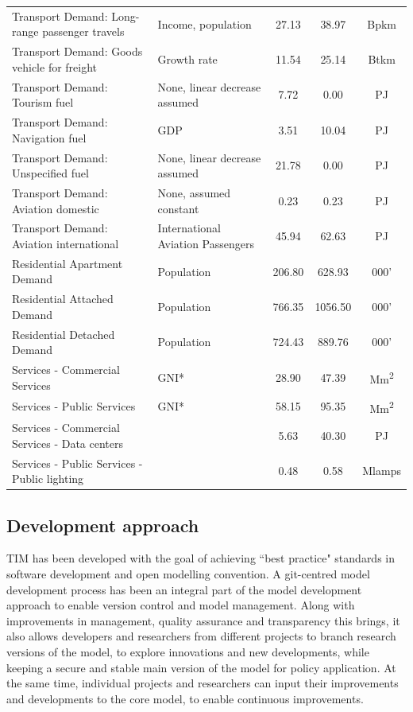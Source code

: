 \documentclass[gmd,manuscript]{copernicus}
\begin{document}
\begin{table}[htbp]
\begin{tabular}{llccc}
    Transport Demand: Long-range passenger travels & Income, population & 27.13 & 38.97 & Bpkm \\
    Transport Demand: Goods vehicle for freight & Growth rate \citep{AECOMIrelandLimited2019} & 11.54 & 25.14 & Btkm \\
    Transport Demand: Tourism fuel  &    None, linear decrease assumed   & 7.72  & 0.00  & PJ \\
    Transport Demand: Navigation fuel  & GDP   & 3.51  & 10.04 & PJ \\
    Transport Demand: Unspecified fuel &    None, linear decrease assumed   & 21.78 & 0.00  & PJ \\
    Transport Demand: Aviation domestic &    None, assumed constant   & 0.23  & 0.23  & PJ \\
    Transport Demand: Aviation international & International Aviation Passengers & 45.94 & 62.63 & PJ \\
    Residential Apartment Demand & Population & 206.80 & 628.93 & 000' \\
    Residential Attached Demand & Population & 766.35 & 1056.50 & 000' \\
    Residential Detached Demand & Population & 724.43 & 889.76 & 000' \\
    Services - Commercial Services & GNI*  & 28.90 & 47.39 & Mm\textsuperscript{2} \\
    Services - Public Services & GNI*  & 58.15 & 95.35 & Mm\textsuperscript{2} \\
    Services - Commercial Services - Data centers & \citet{EirGridT57:online} & 5.63  & 40.30 & PJ \\
    Services - Public Services - Public lighting & \citet{GovernmentofIreland2018} & 0.48  & 0.58  & Mlamps \\ \hline
    \end{tabular}%
  \label{tab:ESD_list}%
\end{table}%


\subsection{Development approach}
\label{ss:model_dev}


TIM has been developed with the goal of achieving ``best practice" standards in software development and open modelling convention. A git-centred model development process has been an integral part of the model development approach to enable version control and model management. Along with improvements in management, quality assurance and transparency this brings, it also allows developers and researchers from different projects to branch research versions of the model, to explore innovations and new developments, while keeping a secure and stable main version of the model for policy application. At the same time, individual projects and researchers can input their improvements and developments to the core model, to enable continuous improvements. 
\end{document}
